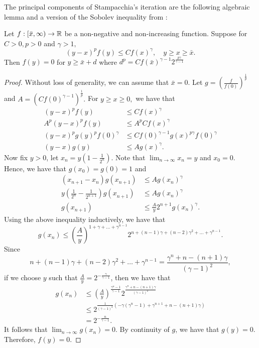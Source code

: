 The principal components of Stampacchia's iteration are the following algebraic lemma and a version of the Sobolev inequality from \cite{michael_sobolev_1973}:
\begin{lemma} \label{SIalg}
	Let $f : [\bar{x},\infty) \to \mathbb{R}$ be a non-negative and non-increasing function. Suppose for $C>0, p>0$ and $\gamma >1,$ 
	\[ (y-x)^{p}f(y) \leq Cf(x)^{\gamma }, \quad y \geq x \geq \bar{x}.\] 
	Then $f(y)=0$ for $y \geq \bar{x} + d$ where $d^p=C f(\bar{x})^{\gamma -1}2^{\frac{p \gamma }{\gamma -1}}$ 
\end{lemma}
\begin{proof}
	Without loss of generality, we can assume that $\bar{x}=0.$ 
	Let $g=(\frac{f}{f(0)})^{\frac{1}{p}}$ and $A=(Cf(0)^{\gamma -1})^{\frac{1}{p}}.$ For $y \geq x \geq 0,$ we have that
	\begin{align*}
		(y-x)^{p}f(y) &\leq Cf(x)^{\gamma }\\
		A^p (y-x)^{p}f(y) &\leq A^p Cf(x)^{\gamma }\\
		(y-x)^p g(y)^p f(0)^{\gamma } &\leq C f(0)^{\gamma-1 }g(x)^{p \gamma } f(0)^{\gamma }\\
		(y-x)g(y) &\leq A g(x)^{\gamma }.
	\end{align*}
	Now fix $y>0$, let $x_n=y(1-\frac{1}{2^n})$. Note that $\lim_{n \to \infty} x_n=y$ and $x_0=0.$ Hence, we have that $g(x_0)=g(0)=1$ and 
	\begin{align*}
		(x_{n+1}-x_n)g(x_{n+1}) &\leq Ag(x_{n}^{} )^{\gamma }\\
		y(\frac{1}{2^{n}}-\frac{1}{2^{n+1}})g(x_{n+1}^{} ) &\leq Ag(x_{n}^{} )^{\gamma }\\
		g(x_{n+1}^{} ) &\leq \frac{A}{y}2^{n+1} g(x_{n}^{} )^{\gamma }.
	\end{align*} 
	Using the above inequality inductively, we have that \[g(x_{n}^{} ) \leq (\frac{A}{y})^{1+\gamma + \dots + \gamma ^{n-1}} 2^{n+(n-1)\gamma + (n-2)\gamma ^2 + \dots + \gamma ^{n-1}}.\]
	Since \[n+(n-1)\gamma + (n-2)\gamma ^2 + \dots + \gamma ^{n-1}=\frac{\gamma ^n+n-(n+1)\gamma }{(\gamma -1)^2},\]
	if we choose $y$ such that $\frac{A}{y}=2^{-\frac{\gamma }{\gamma -1}}$, then we have that 
	\begin{equation*}
	\begin{split}
		g(x_{n}^{} ) 
	&\leq  (\frac{A}{y})^{\frac{\gamma ^n-1}{\gamma -1}} 2^{\frac{\gamma ^n+n-(n+1)\gamma }{(\gamma -1)^2}} \\
	&\leq 2^{\frac{1}{(\gamma -1)^2}(-\gamma (\gamma ^n-1)+\gamma ^{n+1}+n-(n+1)\gamma )}\\
	&=2^{-\frac{n}{\gamma -1}}.
	\end{split}
	\end{equation*}
	It follows that $\lim_{n \to \infty} g(x_n)=0$. By continuity of $g$, we have that $g(y)=0.$ Therefore, $f(y)=0.$  
\end{proof}

